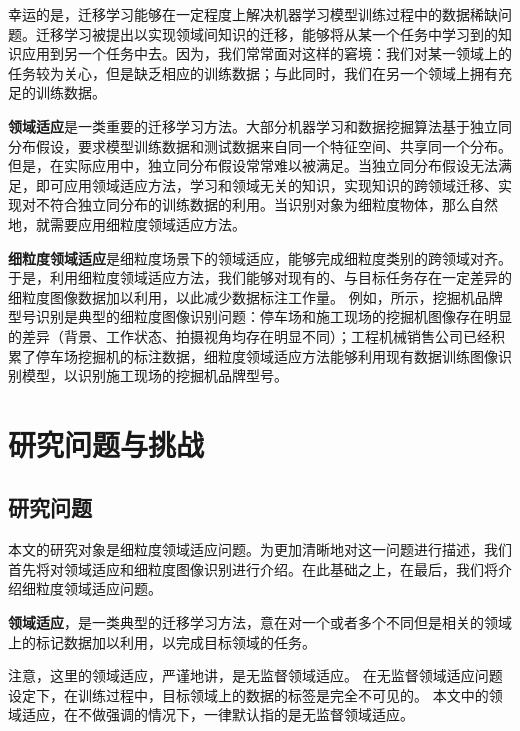 幸运的是，迁移学习能够在一定程度上解决机器学习模型训练过程中的数据稀缺问题\cite{pan2010survey}。迁移学习被提出以实现领域间知识的迁移，能够将从某一个任务中学习到的知识应用到另一个任务中去。因为，我们常常面对这样的窘境：我们对某一领域上的任务较为关心，但是缺乏相应的训练数据；与此同时，我们在另一个领域上拥有充足的训练数据。

\textbf{领域适应}是一类重要的迁移学习方法。大部分机器学习和数据挖掘算法基于独立同分布假设，要求模型训练数据和测试数据来自同一个特征空间、共享同一个分布\cite{pan2010survey}。但是，在实际应用中，独立同分布假设常常难以被满足。当独立同分布假设无法满足，即可应用领域适应方法，学习和领域无关的知识，实现知识的跨领域迁移、实现对不符合独立同分布的训练数据的利用。当识别对象为细粒度物体，那么自然地，就需要应用细粒度领域适应方法。




\textbf{细粒度领域适应}是细粒度场景下的领域适应，能够完成细粒度类别的跨领域对齐。
于是，利用细粒度领域适应方法，我们能够对现有的、与目标任务存在一定差异的细粒度图像数据加以利用，以此减少数据标注工作量。
例如，所示，挖掘机品牌型号识别是典型的细粒度图像识别问题：停车场和施工现场的挖掘机图像存在明显的差异（背景、工作状态、拍摄视角均存在明显不同）；工程机械销售公司已经积累了停车场挖掘机的标注数据，细粒度领域适应方法能够利用现有数据训练图像识别模型，以识别施工现场的挖掘机品牌型号。


\section{研究问题与挑战}
\subsection{研究问题}
本文的研究对象是{\kaishu 细粒度领域适应问题}。为更加清晰地对这一问题进行描述，我们首先将对领域适应和细粒度图像识别进行介绍。在此基础之上，在最后，我们将介绍细粒度领域适应问题。

\textbf{领域适应}，是一类典型的迁移学习方法，意在对一个或者多个不同但是相关的领域上的标记数据加以利用，以完成目标领域的任务。%

注意，这里的领域适应，严谨地讲，是无监督领域适应。
在无监督领域适应问题设定下，在训练过程中，目标领域上的数据的标签是完全不可见的。
本文中的领域适应，在不做强调的情况下，一律默认指的是无监督领域适应。


